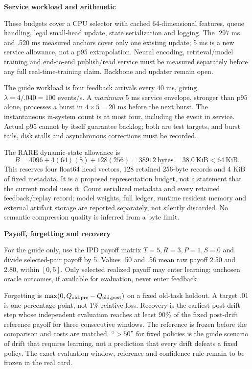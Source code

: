 \documentclass[10pt,a4paper]{article}
\newcommand{\lead}[1]{\vspace{4pt}\textbf{#1}\par}
\begin{document}
\lead{Service workload and arithmetic}
These budgets cover a CPU selector with cached 64-dimensional features, queue
handling, legal small-head update, state serialization and logging. The .297 ms
and .520 ms measured anchors cover only one existing update; 5 ms is a new
service allowance, not a p95 extrapolation. Neural encoding, retrieval/model
training and end-to-end publish/read service must be measured separately before
any full real-time-training claim. Backbone and updater remain open.

The guide workload is four feedback arrivals every 40 ms, giving
$\lambda=4/.040=100$ events/s. A \emph{maximum} 5 ms service envelope, stronger
than p95 alone, processes a burst in $4\times5=20$ ms before the next burst.
The instantaneous in-system count is at most four, including the event in
service. Actual p95 cannot by itself guarantee backlog; both are test targets,
and burst tails, disk stalls and asynchronous corrections must be recorded.

The RARE dynamic-state allowance is
\[
 B=4096+4(64)(8)+128(256)=38912\ \text{bytes}=38.0\ \text{KiB}<64\ \text{KiB}.
\]
This reserves four float64 head vectors, 128 retained 256-byte records and
4 KiB of fixed metadata. It is a proposed representation budget, not a statement
that the current model uses it. Count serialized metadata and every retained
feedback/replay record; model weights, full ledger, runtime resident memory and
external artifact storage are reported separately, not silently discarded.
No semantic compression quality is inferred from a byte limit.

\lead{Payoff, forgetting and recovery}
For the guide only, use the IPD payoff matrix $T=5,R=3,P=1,S=0$ and divide
selected-pair payoff by 5. Values .50 and .56 mean raw payoff 2.50 and 2.80,
within $[0,5]$. Only selected realized payoff may enter learning; unchosen
oracle outcomes, if available for evaluation, never enter feedback.

Forgetting is $\max(0,Q_{\rm old,pre}-Q_{\rm old,post})$ on a fixed old-task
holdout. A target .01 is one percentage point, not 1\% relative loss. Recovery
is the earliest post-drift step whose independent evaluation reaches at least
90\% of the fixed post-drift reference payoff for three consecutive windows.
The reference is frozen before the comparison and costs are matched. ``$>50$''
for fixed policies is the guide scenario of drift that requires learning,
not a prediction that every drift defeats a fixed policy. The exact evaluation
window, reference and confidence rule remain to be frozen in the real card.
\end{document}
